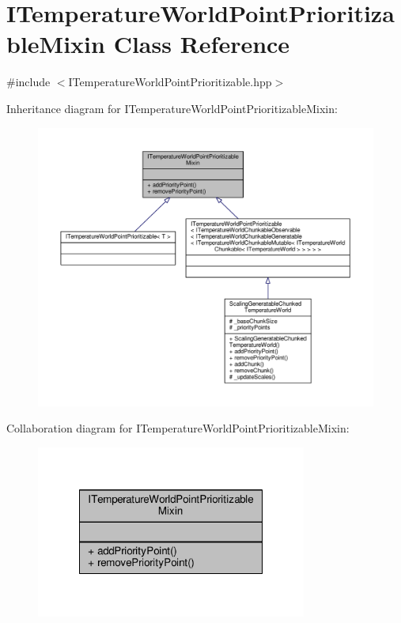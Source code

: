 \hypertarget{class_i_temperature_world_point_prioritizable_mixin}{\section{I\-Temperature\-World\-Point\-Prioritizable\-Mixin Class Reference}
\label{class_i_temperature_world_point_prioritizable_mixin}
}


{\ttfamily \#include $<$I\-Temperature\-World\-Point\-Prioritizable.\-hpp$>$}



Inheritance diagram for I\-Temperature\-World\-Point\-Prioritizable\-Mixin\-:
\nopagebreak
\begin{figure}[H]
\begin{center}
\leavevmode
\includegraphics[width=350pt]{class_i_temperature_world_point_prioritizable_mixin__inherit__graph}
\end{center}
\end{figure}


Collaboration diagram for I\-Temperature\-World\-Point\-Prioritizable\-Mixin\-:
\nopagebreak
\begin{figure}[H]
\begin{center}
\leavevmode
\includegraphics[width=252pt]{class_i_temperature_world_point_prioritizable_mixin__coll__graph}
\end{center}
\end{figure}
